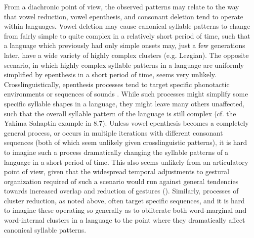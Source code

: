   From a diachronic point of view, the observed patterns may relate to the way that vowel reduction, vowel epenthesis, and consonant deletion tend to operate within languages. Vowel deletion may cause canonical syllable patterns to change from fairly simple to quite complex in a relatively short period of time, such that a language which previously had only simple onsets may, just a few generations later, have a wide variety of highly complex clusters (e.g. Lezgian). The opposite scenario, in which highly complex syllable patterns in a language are uniformly simplified by epenthesis in a short period of time, seems very unlikely. Crosslinguistically, epenthesis processes tend to target specific phonotactic environments or sequences of sounds \citep{Hall2011}. While such processes might simplify some specific syllable shapes in a language, they might leave many others unaffected, such that the overall syllable pattern of the language is still complex (cf. the Yakima Sahaptin example in 8.7). Unless vowel epenthesis becomes a completely general process, or occurs in multiple iterations with different consonant sequences (both of which seem unlikely given crosslinguistic patterns), it is hard to imagine such a process dramatically changing the syllable patterns of a language in a short period of time. This also seems unlikely from an articulatory point of view, given that the widespread temporal adjustments to gestural organization required of such a scenario would run against general tendencies towards increased overlap and reduction of gestures (\citealt{BrowmanGoldstein1992b}). Similarly, processes of cluster reduction, as noted above, often target specific sequences, and it is hard to imagine these operating so generally as to obliterate both word-marginal and word-internal clusters in a language to the point where they dramatically affect canonical syllable patterns. 

